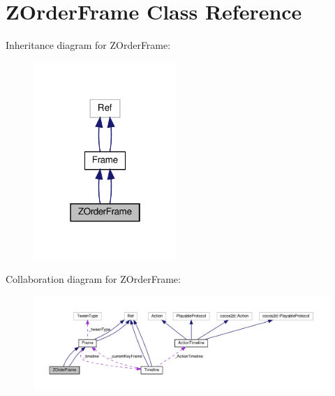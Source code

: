 \hypertarget{classZOrderFrame}{}\section{Z\+Order\+Frame Class Reference}
\label{classZOrderFrame}


Inheritance diagram for Z\+Order\+Frame\+:
\nopagebreak
\begin{figure}[H]
\begin{center}
\leavevmode
\includegraphics[width=154pt]{classZOrderFrame__inherit__graph}
\end{center}
\end{figure}


Collaboration diagram for Z\+Order\+Frame\+:
\nopagebreak
\begin{figure}[H]
\begin{center}
\leavevmode
\includegraphics[width=350pt]{classZOrderFrame__coll__graph}
\end{center}
\end{figure}
